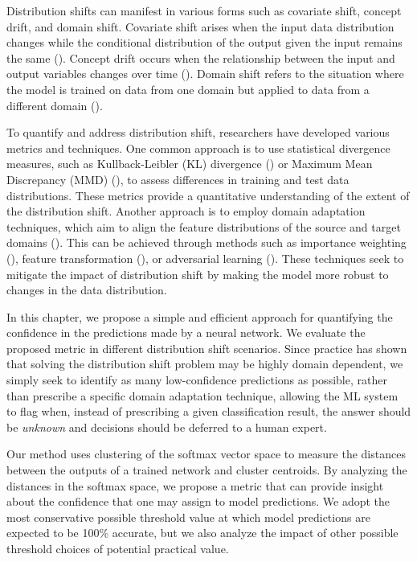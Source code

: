 Distribution shifts can manifest in various forms such as covariate shift, concept drift, and domain shift. Covariate shift arises when the input data distribution changes while the conditional distribution of the output given the input remains the same (\cite{shimodaira2000improving}). Concept drift occurs when the relationship between the input and output variables changes over time (\cite{gama2014survey}). Domain shift refers to the situation where the model is trained on data from one domain but applied to data from a different domain (\cite{patel2015visual}).

To quantify and address distribution shift, researchers have developed various metrics and techniques. One common approach is to use statistical divergence measures, such as Kullback-Leibler (KL) divergence (\cite{kullback1951information}) or Maximum Mean Discrepancy (MMD) (\cite{gretton2012kernel}), to assess differences in training and test data distributions. These metrics provide a quantitative understanding of the extent of the distribution shift.
Another approach is to employ domain adaptation techniques, which aim to align the feature distributions of the source and target domains (\cite{wang2018deep}). This can be achieved through methods such as importance weighting (\cite{sugiyama2007covariate}), feature transformation (\cite{pan2009survey}), or adversarial learning (\cite{ganin2016domain}). These techniques seek to mitigate the impact of distribution shift by making the model more robust to changes in the data distribution.

In this chapter, we propose a simple and efficient approach for quantifying the confidence in the predictions made by a neural network. We evaluate the proposed metric in different distribution shift scenarios. Since practice has shown that solving the distribution shift problem may be highly domain dependent, we simply seek to identify as many low-confidence predictions as possible, rather than prescribe a specific domain adaptation technique, allowing the ML system to flag when, instead of prescribing a given classification result, the answer should be \textit{unknown} and decisions should be deferred to a human expert. 

Our method uses clustering of the softmax vector space to measure the distances between the outputs of a trained network and cluster centroids. By analyzing the distances in the softmax space, we propose a metric that can provide insight about the confidence that one may assign to model predictions. We adopt the most conservative possible threshold value at which model predictions are expected to be 100\% accurate, but we also analyze the impact of other possible threshold choices of potential practical value.

